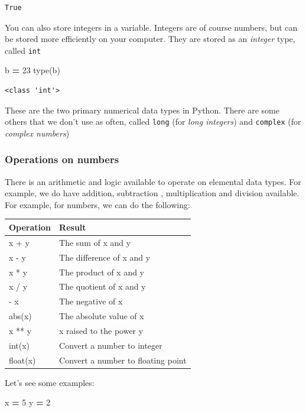 \documentclass[
  letterpaper,
]{scrbook}
\newenvironment{Shaded}{\begin{snugshade}}{\end{snugshade}}
\newcommand{\BuiltInTok}[1]{#1}
\newcommand{\DecValTok}[1]{\textcolor[rgb]{0.00,0.00,0.81}{#1}}
\newcommand{\NormalTok}[1]{#1}
\newcommand{\OperatorTok}[1]{\textcolor[rgb]{0.81,0.36,0.00}{\textbf{#1}}}
\begin{document}
\begin{verbatim}
True
\end{verbatim}

You can also store integers in a variable. Integers are of course numbers, but can be stored more efficiently on your computer. They are stored as an \emph{integer} type, called \texttt{int}

\begin{Shaded}
\begin{Highlighting}[]
\NormalTok{b }\OperatorTok{=} \DecValTok{23}
\BuiltInTok{type}\NormalTok{(b)}
\end{Highlighting}
\end{Shaded}

\begin{verbatim}
<class 'int'>
\end{verbatim}

These are the two primary numerical data types in Python. There are some others that we don't use as often, called \texttt{long} (for \emph{long integers}) and \texttt{complex} (for \emph{complex numbers})

\hypertarget{operations-on-numbers}{%
\subsubsection{Operations on numbers}\label{operations-on-numbers}}

There is an arithmetic and logic available to operate on elemental data types. For example, we do have addition, subtraction , multiplication and division available. For example, for numbers, we can do the following:

\begin{longtable}[]{@{}ll@{}}
\toprule
Operation & Result\tabularnewline
\midrule
\endhead
x + y & The sum of x and y\tabularnewline
x - y & The difference of x and y\tabularnewline
x * y & The product of x and y\tabularnewline
x / y & The quotient of x and y\tabularnewline
- x & The negative of x\tabularnewline
abs(x) & The absolute value of x\tabularnewline
x ** y & x raised to the power y\tabularnewline
int(x) & Convert a number to integer\tabularnewline
float(x) & Convert a number to floating point\tabularnewline
\bottomrule
\end{longtable}

Let's see some examples:

\begin{Shaded}
\begin{Highlighting}[]
\NormalTok{x }\OperatorTok{=} \DecValTok{5}
\NormalTok{y }\OperatorTok{=} \DecValTok{2}
\end{Highlighting}
\end{Shaded}
\end{document}
